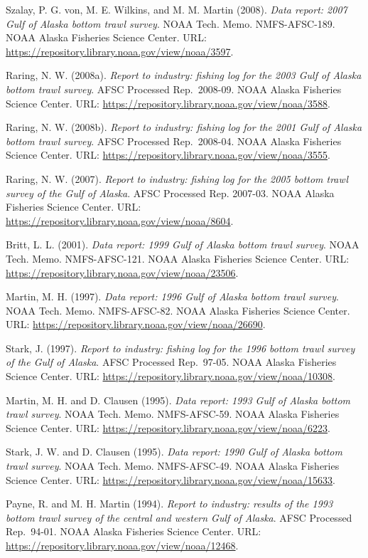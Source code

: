 \documentclass[
  letterpaper,
  oneside,
  open=any]{scrbook}
\begin{document}
Szalay, P. G. von, M. E. Wilkins, and M. M. Martin (2008). \emph{Data
report: 2007 Gulf of Alaska bottom trawl survey}. NOAA Tech. Memo.
NMFS-AFSC-189. NOAA Alaska Fisheries Science Center. URL:
\url{https://repository.library.noaa.gov/view/noaa/3597}.

Raring, N. W. (2008a). \emph{Report to industry: fishing log for the
2003 Gulf of Alaska bottom trawl survey}. AFSC Processed Rep.~2008-09.
NOAA Alaska Fisheries Science Center. URL:
\url{https://repository.library.noaa.gov/view/noaa/3588}.

Raring, N. W. (2008b). \emph{Report to industry: fishing log for the
2001 Gulf of Alaska bottom trawl survey}. AFSC Processed Rep.~2008-04.
NOAA Alaska Fisheries Science Center. URL:
\url{https://repository.library.noaa.gov/view/noaa/3555}.

Raring, N. W. (2007). \emph{Report to industry: fishing log for the 2005
bottom trawl survey of the Gulf of Alaska}. AFSC Processed Rep. 2007-03.
NOAA Alaska Fisheries Science Center. URL:
\url{https://repository.library.noaa.gov/view/noaa/8604}.

Britt, L. L. (2001). \emph{Data report: 1999 Gulf of Alaska bottom trawl
survey}. NOAA Tech. Memo. NMFS-AFSC-121. NOAA Alaska Fisheries Science
Center. URL: \url{https://repository.library.noaa.gov/view/noaa/23506}.

Martin, M. H. (1997). \emph{Data report: 1996 Gulf of Alaska bottom
trawl survey}. NOAA Tech. Memo. NMFS-AFSC-82. NOAA Alaska Fisheries
Science Center. URL:
\url{https://repository.library.noaa.gov/view/noaa/26690}.

Stark, J. (1997). \emph{Report to industry: fishing log for the 1996
bottom trawl survey of the Gulf of Alaska}. AFSC Processed Rep.~97-05.
NOAA Alaska Fisheries Science Center. URL:
\url{https://repository.library.noaa.gov/view/noaa/10308}.

Martin, M. H. and D. Clausen (1995). \emph{Data report: 1993 Gulf of
Alaska bottom trawl survey}. NOAA Tech. Memo. NMFS-AFSC-59. NOAA Alaska
Fisheries Science Center. URL:
\url{https://repository.library.noaa.gov/view/noaa/6223}.

Stark, J. W. and D. Clausen (1995). \emph{Data report: 1990 Gulf of
Alaska bottom trawl survey}. NOAA Tech. Memo. NMFS-AFSC-49. NOAA Alaska
Fisheries Science Center. URL:
\url{https://repository.library.noaa.gov/view/noaa/15633}.

Payne, R. and M. H. Martin (1994). \emph{Report to industry: results of
the 1993 bottom trawl survey of the central and western Gulf of Alaska}.
AFSC Processed Rep.~94-01. NOAA Alaska Fisheries Science Center. URL:
\url{https://repository.library.noaa.gov/view/noaa/12468}.
\end{document}
